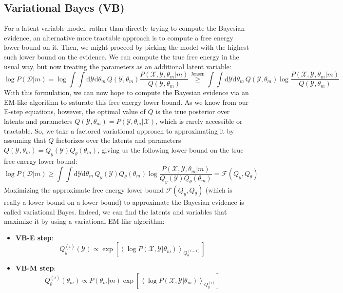 \documentclass[a4paper]{article}
\begin{document}
\subsection{Variational Bayes (VB)}
For a latent variable model, rather than directly trying to compute the Bayesian evidence, an alternative more tractable approach is to compute a free energy lower bound on it. Then, we might proceed by picking the model with the highest such lower bound on the evidence. We can compute the true free energy in the usual way, but now treating the parameters as an additional latent variable:
\[ \log P(\mathcal{D}|m) = \log \int\int \textrm{d}\mathcal{Y} \textrm{d}\theta_m \, Q(\mathcal{Y},\theta_m) \frac{P(\mathcal{X},\mathcal{Y},\theta_m|m)}{Q(\mathcal{Y},\theta_m)} \overset{\text{Jensen}}{\geq} \int\int \textrm{d}\mathcal{Y} \textrm{d}\theta_m \, Q(\mathcal{Y},\theta_m) \log \frac{P(\mathcal{X},\mathcal{Y},\theta_m|m)}{Q(\mathcal{Y},\theta_m)} \]
With this formulation, we can now hope to compute the Bayesian evidence via an EM-like algorithm to saturate this free energy lower bound. As we know from our E-step equations, however, the optimal value of $Q$ is the true posterior over latents and parameters $Q(\mathcal{Y},\theta_m) = P(\mathcal{Y},\theta_m | \mathcal{X})$, which is rarely accessible or tractable. So, we take a factored variational approach to approximating it by assuming that $Q$ factorizes over the latents and parameters $Q(\mathcal{Y},\theta_m) = Q_y(\mathcal{Y})Q_\theta(\theta_m)$, giving us the following lower bound on the true free energy lower bound:
\[ \log P(\mathcal{D}|m) \geq \int\int \textrm{d}\mathcal{Y} \textrm{d}\theta_m \, Q_y(\mathcal{Y})Q_\theta(\theta_m) \log \frac{P(\mathcal{X},\mathcal{Y},\theta_m|m)}{Q_y(\mathcal{Y})Q_\theta(\theta_m)} = \mathcal{F}(Q_y,Q_\theta) \]
Maximizing the approximate free energy lower bound $\mathcal{F}(Q_y,Q_\theta)$ (which is really a lower bound on a lower bound) to approximate the Bayesian evidence is called variational Bayes. Indeed, we can find the latents and variables that maximize it by using a variational EM-like algorithm:
\begin{itemize}
\item \textbf{VB-E step}:
\[ Q_y^{(i)}(\mathcal{Y}) \propto \exp\left[\left\langle \log P(\mathcal{X},\mathcal{Y}|\theta_m)\right\rangle_{Q_\theta^{(i-1)}} \right] \]
\item \textbf{VB-M step}:
\[ Q_\theta^{(i)}(\theta_m) \propto P(\theta_m|m)\exp\left[\left\langle \log P(\mathcal{X},\mathcal{Y}|\theta_m)\right\rangle_{Q_y^{(i)}} \right] \]
\end{itemize}
\end{document}
